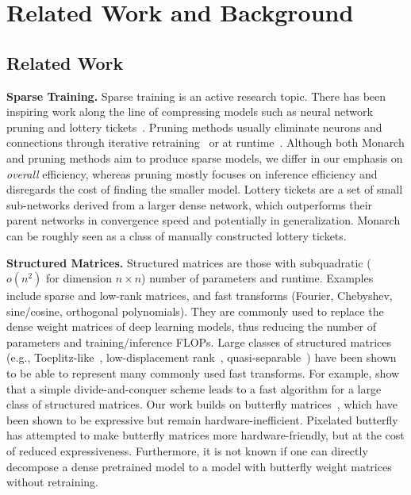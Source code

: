 \section{Related Work and Background}
\label{sec:related_work}

\subsection{Related Work}

\textbf{Sparse Training.}
Sparse training is an active research topic. There has been inspiring work along the line of compressing models such as neural network pruning and lottery tickets~\citep{han2015deep,han2015learning, frankle2018lottery}. Pruning methods usually eliminate neurons and connections through iterative retraining~\citep{han2015deep,han2015learning,sanh2020movement} or at runtime~\citep{NIPS2017_a51fb975,dong2017learning}. 
Although both Monarch and pruning methods aim to produce sparse models, we differ in our emphasis on \emph{overall} efficiency, whereas pruning mostly focuses on inference efficiency and disregards the cost of finding the smaller model. Lottery tickets \citep{frankle2018lottery,frankle2019stabilizing,frankle2020linear} are a set of small sub-networks derived from a larger dense network, which outperforms their parent networks in convergence speed and potentially in generalization. Monarch can be roughly seen as a class of manually constructed lottery tickets.

\textbf{Structured Matrices.}
Structured matrices are those with subquadratic ($o(n^2)$ for dimension $n \times n$) number of parameters and runtime.
Examples include sparse and low-rank matrices, and fast transforms (Fourier, Chebyshev, sine/cosine, orthogonal polynomials).
They are commonly used to replace the dense weight matrices of deep learning models, thus reducing the number of parameters and training/inference FLOPs.
Large classes of structured matrices (e.g., Toeplitz-like~\citep{sindhwani2015structured}, low-displacement rank~\citep{kailath1979displacement}, quasi-separable~\citep{eidelman1999new}) have been shown to be able to represent many commonly used fast transforms.
For example, \citet{desa2018two} show that a simple divide-and-conquer scheme leads to a fast algorithm for a large class of structured matrices.
Our work builds on butterfly matrices~\citep{parker1995random, dao2019learning},
which have been shown to be expressive but remain hardware-inefficient.
Pixelated butterfly~\citep{chen2021pixelated} has attempted to make butterfly matrices more hardware-friendly, but at the cost of reduced expressiveness.
Furthermore, it is not known if one can directly decompose a dense pretrained model to a model with butterfly weight matrices without retraining.


